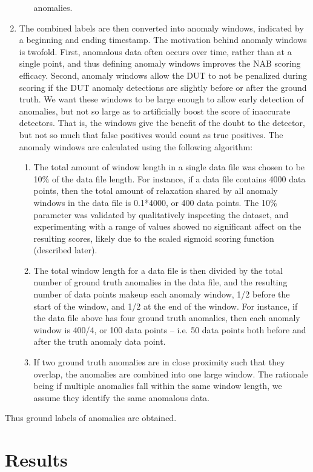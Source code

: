 \documentclass[12pt]{article}
\begin{document}
\begin{enumerate}
\begin{enumerate}
anomalies.
\end{enumerate}
\item The combined labels are then converted into anomaly windows, indicated
by a beginning and ending timestamp. The motivation behind anomaly
windows is twofold. First, anomalous data often occurs over time, rather
than at a single point, and thus defining anomaly windows improves the
NAB scoring efficacy. Second, anomaly windows allow the DUT to not be
penalized during scoring if the DUT anomaly detections are slightly before
or after the ground truth. We want these windows to be large enough to
allow early detection of anomalies, but not so large as to artificially boost
the score of inaccurate detectors. That is, the windows give the benefit of
the doubt to the detector, but not so much that false positives would count
as true positives. The anomaly windows are calculated using the following
algorithm:
\begin{enumerate}
\item The total amount of window length in a single data file was chosen
to be 10\% of the data file length. For instance, if a data file contains
4000 data points, then the total amount of relaxation shared by all
anomaly windows in the data file is 0.1*4000, or 400 data points.
The 10\% parameter was validated by qualitatively inspecting the
dataset, and experimenting with a range of values showed no
significant affect on the resulting scores, likely due to the scaled
sigmoid scoring function (described later).
\item The total window length for a data file is then divided by the total
number of ground truth anomalies in the data file, and the resulting
number of data points makeup each anomaly window, 1/2 before
the start of the window, and 1/2 at the end of the window. For
instance, if the data file above has four ground truth anomalies,
then each anomaly window is 400/4, or 100 data points – i.e. 50
data points both before and after the truth anomaly data point.
\item If two ground truth anomalies are in close proximity such that they
overlap, the anomalies are combined into one large window. The
rationale being if multiple anomalies fall within the same window
length, we assume they identify the same anomalous data.
\end{enumerate}
\end{enumerate}
Thus ground labels of anomalies are obtained. 

\newpage
\section{Results}
\end{document}
